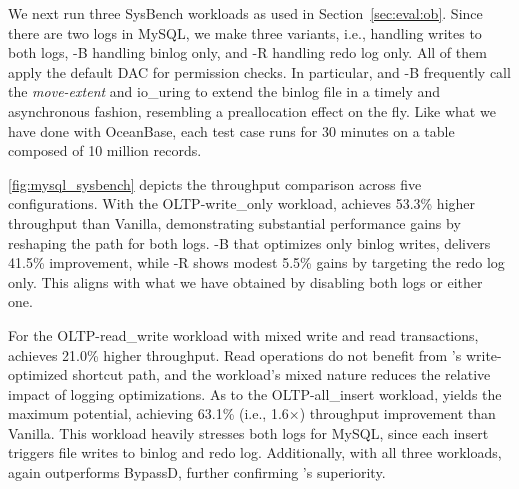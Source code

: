 We next %
run three SysBench  workloads  as used in Section~\ref{sec:eval:ob}. 
Since there are two logs in MySQL, we make three variants, i.e., \odes handling writes to both logs, \odes-B handling binlog only, and \odes-R handling redo log only.
All of them apply the default DAC for permission checks. In particular,
\odes and \odes-B frequently call the {\em move-extent} and io\_uring
to extend the binlog file in a timely and asynchronous fashion,
resembling a preallocation effect on the fly.
Like what we have done with OceanBase,
 each test case runs for 30 minutes %
on a  table composed of 10 million records. 


\autoref{fig:mysql_sysbench} depicts the throughput comparison across five configurations.
With the OLTP-write\_only workload, \odes achieves 53.3\%  higher throughput than  Vanilla, demonstrating substantial performance gains by reshaping the path for both logs. \odes-B that optimizes only binlog writes, delivers 41.5\% improvement, while \odes-R shows modest 5.5\% gains by targeting the redo log only. 
This aligns with what we have obtained by disabling both logs or either one.


For the OLTP-read\_write workload with mixed write and read transactions, \odes achieves 21.0\% higher throughput.
 Read operations do not benefit from \odes's write-optimized shortcut path, and the workload's mixed nature reduces the relative impact of logging optimizations. 
As to  the OLTP-all\_insert workload, \odes yields the maximum potential, achieving 63.1\%
(i.e., 1.6$\times$) throughput improvement than Vanilla. This workload heavily stresses both  logs for MySQL, since each insert triggers file writes to binlog and redo log. 
Additionally, with all three workloads, %
\odes again outperforms BypassD,
 further confirming \odes's superiority. %



